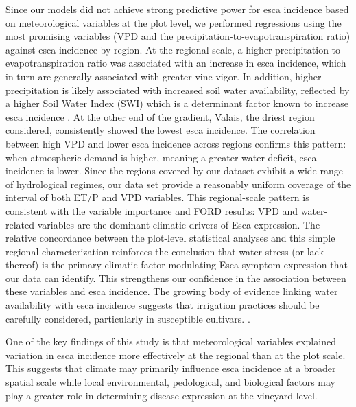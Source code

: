 Since our models did not achieve strong predictive power for esca incidence based on meteorological variables at the plot level, we performed regressions using the most promising variables (VPD and the precipitation-to-evapotranspiration ratio) against esca incidence by region. At the regional scale, a higher precipitation-to-evapotranspiration ratio was associated with an increase in esca incidence, which in turn are generally associated with greater vine vigor. In addition, higher precipitation is likely associated with increased soil water availability, reflected by a higher Soil Water Index (SWI) which is a determinant factor known to increase esca incidence \citep{etienne_identification_2026,monod_identifying_2025}. At the other end of the gradient, Valais, the driest region considered, consistently showed the lowest esca incidence. The correlation between high VPD and lower esca incidence across regions confirms this pattern: when atmospheric demand is higher, meaning a greater water deficit, esca incidence is lower. Since the regions covered by our dataset exhibit a wide range of hydrological regimes, our data set provide a reasonably uniform coverage of the interval of both ET/P and VPD variables. This regional-scale pattern is consistent with the variable importance and FORD results: VPD and water-related variables are the dominant climatic drivers of Esca expression. The relative concordance between the plot-level statistical analyses and this simple regional characterization reinforces the conclusion that water stress (or lack thereof) is the primary climatic factor modulating Esca symptom expression that our data can identify. This strengthens our confidence in the association between these variables and esca incidence. The growing body of evidence linking water availability with esca incidence suggests that irrigation practices should be carefully considered, particularly in susceptible cultivars. \citep{etienne_identification_2026}.

One of the key findings of this study is that meteorological variables explained variation in esca incidence more effectively at the regional than at the plot scale. This suggests that climate may primarily influence esca incidence at a broader spatial scale while local environmental, pedological, and biological factors may play a greater role in determining disease expression at the vineyard level.
